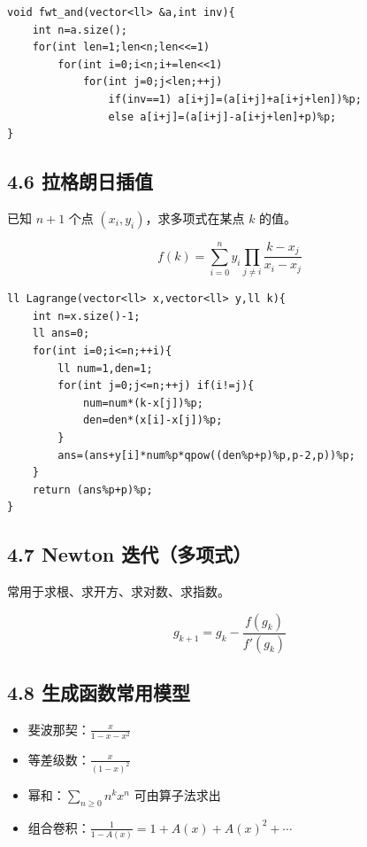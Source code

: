 \documentclass[UTF8,a4paper,11pt]{ctexart}
\begin{document}
\begin{Verbatim}[fontsize=\small,frame=single,breaklines=true,breakanywhere=true]
void fwt_and(vector<ll> &a,int inv){
    int n=a.size();
    for(int len=1;len<n;len<<=1)
        for(int i=0;i<n;i+=len<<1)
            for(int j=0;j<len;++j)
                if(inv==1) a[i+j]=(a[i+j]+a[i+j+len])%p;
                else a[i+j]=(a[i+j]-a[i+j+len]+p)%p;
}
\end{Verbatim}

\subsection*{4.6 拉格朗日插值}

已知 $n+1$ 个点 $(x_i,y_i)$，求多项式在某点 $k$ 的值。

\[
f(k)=\sum_{i=0}^n y_i\prod_{j\ne i}\frac{k-x_j}{x_i-x_j}
\]

\begin{Verbatim}[fontsize=\small,frame=single,breaklines=true,breakanywhere=true]
ll Lagrange(vector<ll> x,vector<ll> y,ll k){
    int n=x.size()-1;
    ll ans=0;
    for(int i=0;i<=n;++i){
        ll num=1,den=1;
        for(int j=0;j<=n;++j) if(i!=j){
            num=num*(k-x[j])%p;
            den=den*(x[i]-x[j])%p;
        }
        ans=(ans+y[i]*num%p*qpow((den%p+p)%p,p-2,p))%p;
    }
    return (ans%p+p)%p;
}
\end{Verbatim}

\subsection*{4.7 Newton 迭代（多项式）}

常用于求根、求开方、求对数、求指数。

\[
g_{k+1}=g_k-\frac{f(g_k)}{f'(g_k)}
\]

\subsection*{4.8 生成函数常用模型}

\begin{itemize}[leftmargin=2em,itemsep=0.2em,topsep=0.2em]
\item 斐波那契：$\frac{x}{1-x-x^2}$
\item 等差级数：$\frac{x}{(1-x)^2}$
\item 幂和：$\sum_{n\ge 0}n^k x^n$ 可由算子法求出
\item 组合卷积：$\frac{1}{1-A(x)}=1+A(x)+A(x)^2+\cdots$


\end{itemize}
\end{document}
